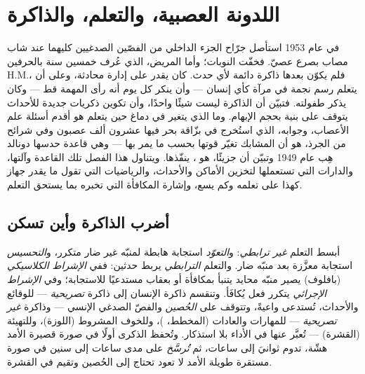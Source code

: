 \chapter{اللدونة العصبية، والتعلم، والذاكرة}\label{ch:b3:learning-memory}

في عام 1953 استأصل جرّاح الجزء الداخلي من الفصّين الصدغيين
كليهما عند شاب مصاب بصرع عصيّ. فخفّت النوبات؛ وأما المريض،
الذي عُرف خمسين سنة بالحرفين H.M.، فلم يكوّن بعدها ذاكرة
دائمة لأي حدث. كان يقدر على إدارة محادثة، وعلى أن يتعلم رسم
نجمة في مرآة كأي إنسان --- وأن ينكر كل يوم أنه رأى المهمة
قط --- وكان يذكر طفولته. فتبيّن أن الذاكرة ليست شيئًا
واحدًا، وأن تكوين ذكريات جديدة للأحداث يتوقف على بنية بحجم
الإبهام. وما الذي يتغير في دماغ حين يتعلم هو أقدم أسئلة علم
الأعصاب، وجوابه، الذي استُخرج في بزّاقة بحر فيها عشرون ألف
عصبون وفي شرائح من  الجرذ، هو أن المشابك تغيّر قوتها
بحسب ما يمر بها --- وهي قاعدة حدسها دونالد هِب عام 1949
وتبيّن أن جزيئًا، هو ، ينفّذها. ويتناول هذا الفصل
تلك القاعدة وآلتها، والدارات التي تستعملها لتخزين الأماكن
والأحداث، والرياضيات التي تقول ما يقدر جهاز كهذا على تعلمه
وكم يسع، وإشارة المكافأة التي تخبره بما يستحق التعلم.

\section{أضرب الذاكرة وأين تسكن}

\begin{definition}\label{def:b3:learning-memory:kinds}
أبسط التعلم \emph{غير ترابطي}: و\emph{التعوّد} استجابة
هابطة لمنبّه غير ضار متكرر، و\emph{التحسيس} استجابة معزَّزة
بعد منبّه ضار. والتعلم \emph{الترابطي} يربط حدثين: ففي
\emph{الإشراط الكلاسيكي} (بافلوف) يصير منبّه محايد يتنبأ
بمكافأة أو بعقاب مستدعيًا للاستجابة؛ وفي \emph{الإشراط
الإجرائي} يتكرر فعل يُكافَأ. وتنقسم ذاكرة الإنسان إلى ذاكرة
\emph{تصريحية} --- للوقائع والأحداث، تُستدعى واعيةً، وتتوقف
على \emph{الحُصين} والفصّ الصدغي الإنسي --- وذاكرة \emph{غير
تصريحية} --- للمهارات والعادات (المخطط، )، وللخوف
المشروط (اللوزة)، وللتهيئة (القشرة) --- تُعبَّر عنها في
الأداء بلا استذكار. وتُحفظ الذكرى أولًا في صورة قصيرة الأمد
هشّة، تدوم ثوانيَ إلى ساعات، ثم \emph{تُرسَّخ} على مدى ساعات
إلى سنين في صورة مستقرة طويلة الأمد لا تعود تحتاج إلى
الحُصين وتقيم في القشرة.
\end{definition}

